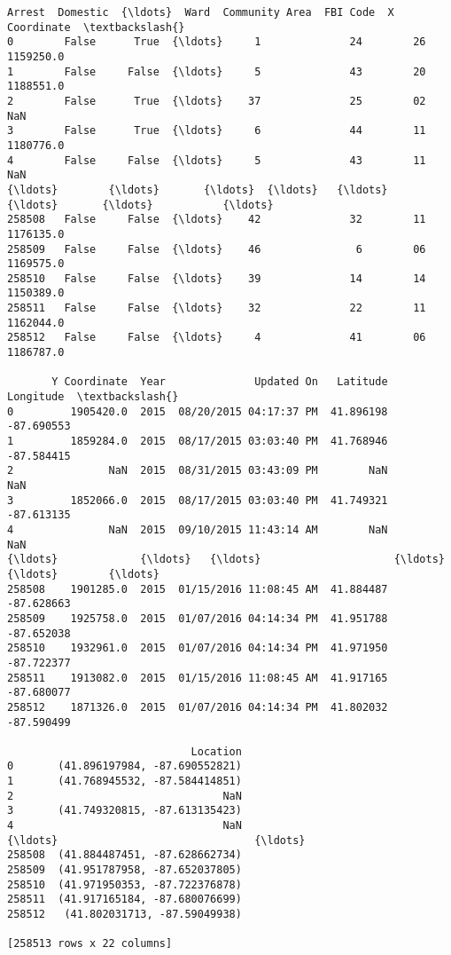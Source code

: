 \documentclass[11pt]{article}
\begin{document}
\begin{tcolorbox}[breakable, size=fbox, boxrule=.5pt, pad at break*=1mm, opacityfill=0]
\begin{Verbatim}[commandchars=\\\{\}]
        Arrest  Domestic  {\ldots}  Ward  Community Area  FBI Code  X Coordinate  \textbackslash{}
0        False      True  {\ldots}     1              24        26     1159250.0
1        False     False  {\ldots}     5              43        20     1188551.0
2        False      True  {\ldots}    37              25        02           NaN
3        False      True  {\ldots}     6              44        11     1180776.0
4        False     False  {\ldots}     5              43        11           NaN
{\ldots}        {\ldots}       {\ldots}  {\ldots}   {\ldots}             {\ldots}       {\ldots}           {\ldots}
258508   False     False  {\ldots}    42              32        11     1176135.0
258509   False     False  {\ldots}    46               6        06     1169575.0
258510   False     False  {\ldots}    39              14        14     1150389.0
258511   False     False  {\ldots}    32              22        11     1162044.0
258512   False     False  {\ldots}     4              41        06     1186787.0

       Y Coordinate  Year              Updated On   Latitude  Longitude  \textbackslash{}
0         1905420.0  2015  08/20/2015 04:17:37 PM  41.896198 -87.690553
1         1859284.0  2015  08/17/2015 03:03:40 PM  41.768946 -87.584415
2               NaN  2015  08/31/2015 03:43:09 PM        NaN        NaN
3         1852066.0  2015  08/17/2015 03:03:40 PM  41.749321 -87.613135
4               NaN  2015  09/10/2015 11:43:14 AM        NaN        NaN
{\ldots}             {\ldots}   {\ldots}                     {\ldots}        {\ldots}        {\ldots}
258508    1901285.0  2015  01/15/2016 11:08:45 AM  41.884487 -87.628663
258509    1925758.0  2015  01/07/2016 04:14:34 PM  41.951788 -87.652038
258510    1932961.0  2015  01/07/2016 04:14:34 PM  41.971950 -87.722377
258511    1913082.0  2015  01/15/2016 11:08:45 AM  41.917165 -87.680077
258512    1871326.0  2015  01/07/2016 04:14:34 PM  41.802032 -87.590499

                             Location
0       (41.896197984, -87.690552821)
1       (41.768945532, -87.584414851)
2                                 NaN
3       (41.749320815, -87.613135423)
4                                 NaN
{\ldots}                               {\ldots}
258508  (41.884487451, -87.628662734)
258509  (41.951787958, -87.652037805)
258510  (41.971950353, -87.722376878)
258511  (41.917165184, -87.680076699)
258512   (41.802031713, -87.59049938)

[258513 rows x 22 columns]
\end{Verbatim}
\end{tcolorbox}
        
\end{document}
